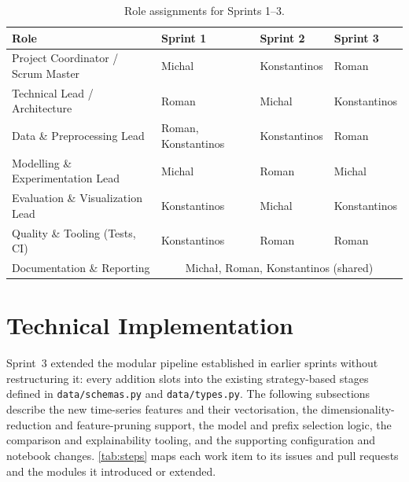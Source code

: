 \documentclass[runningheads]{llncs}
\begin{document}
\begin{table}[H]
    \caption{Role assignments for Sprints 1--3.}\label{tab:roles}
    \centering
    \begin{tabular}{@{}llll@{}}
        \toprule
        \textbf{Role}                      & \textbf{Sprint 1}                                        & \textbf{Sprint 2} & \textbf{Sprint 3} \\
        \midrule
        Project Coordinator / Scrum Master & Michal                                                   & Konstantinos      & Roman             \\
        Technical Lead / Architecture      & Roman                                                    & Michal            & Konstantinos      \\
        Data \& Preprocessing Lead         & Roman, Konstantinos                                      & Konstantinos      & Roman             \\
        Modelling \& Experimentation Lead  & Michal                                                   & Roman             & Michal            \\
        Evaluation \& Visualization Lead   & Konstantinos                                             & Michal            & Konstantinos      \\
        Quality \& Tooling (Tests, CI)     & Konstantinos                                             & Roman             & Roman             \\
        Documentation \& Reporting         & \multicolumn{3}{c}{Michał, Roman, Konstantinos (shared)}                                         \\
        \bottomrule
    \end{tabular}
\end{table}

\section{Technical Implementation}
Sprint~3 extended the modular pipeline established in earlier sprints without restructuring it:
every addition slots into the existing strategy-based stages defined in
\texttt{data/schemas.py} and \texttt{data/types.py}. The following subsections describe the new
time-series features and their vectorisation, the dimensionality-reduction and feature-pruning
support, the model and prefix selection logic, the comparison and explainability tooling, and
the supporting configuration and notebook changes. \autoref{tab:steps} maps each work item to
its issues and pull requests and the modules it introduced or extended.
\end{document}
